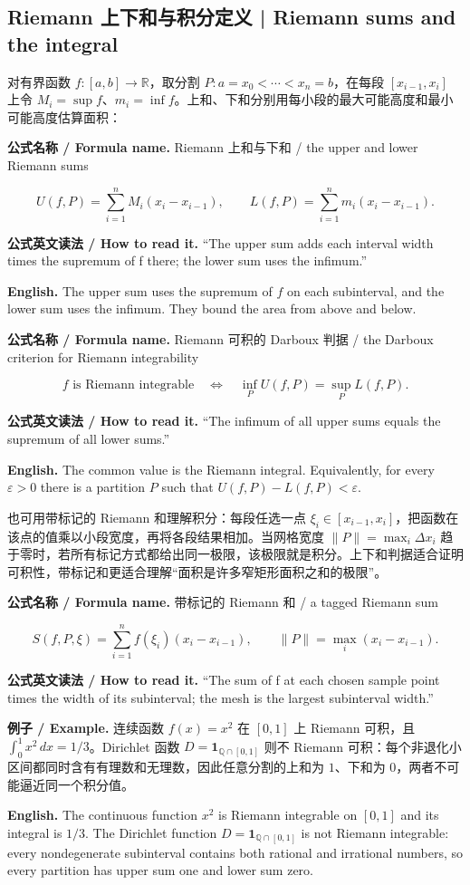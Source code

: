 \documentclass[UTF8,11pt,a4paper]{ctexart}
\newcommand{\EN}[1]{\par\noindent\textbf{English.} #1\par}
\newcommand{\READ}[1]{\par\noindent\textbf{公式英文读法 / How to read it.} #1\par}
\let\APSsubsection\subsection
\renewcommand{\subsection}[1]{\Needspace{6\baselineskip}\APSsubsection{#1}}
\newcommand{\FORMULA}[2]{\par\Needspace{3\baselineskip}\noindent\textbf{公式名称 / Formula name.} #1 / #2\par}
\newcommand{\EX}[2]{\par\noindent\textbf{例子 / Example.} #1\par\EN{#2}}
\begin{document}
\subsection{Riemann 上下和与积分定义 | Riemann sums and the integral}
\noindent 对有界函数 $f:[a,b]\to\mathbb R$，取分割 $P:a=x_0<\cdots<x_n=b$，在每段 $[x_{i-1},x_i]$ 上令 $M_i=\sup f$、$m_i=\inf f$。上和、下和分别用每小段的最大可能高度和最小可能高度估算面积：
\FORMULA{Riemann 上和与下和}{the upper and lower Riemann sums}
\[
U(f,P)=\sum_{i=1}^n M_i(x_i-x_{i-1}),
\qquad
L(f,P)=\sum_{i=1}^n m_i(x_i-x_{i-1}).
\]
\READ{“The upper sum adds each interval width times the supremum of f there; the lower sum uses the infimum.”}
\EN{The upper sum uses the supremum of $f$ on each subinterval, and the lower sum uses the infimum. They bound the area from above and below.}
\FORMULA{Riemann 可积的 Darboux 判据}{the Darboux criterion for Riemann integrability}
\[
f\text{ is Riemann integrable}
\quad\Longleftrightarrow\quad
\inf_P U(f,P)=\sup_P L(f,P).
\]
\READ{“The infimum of all upper sums equals the supremum of all lower sums.”}
\EN{The common value is the Riemann integral. Equivalently, for every $\varepsilon>0$ there is a partition $P$ such that $U(f,P)-L(f,P)<\varepsilon$.}
\noindent 也可用带标记的 Riemann 和理解积分：每段任选一点 $\xi_i\in[x_{i-1},x_i]$，把函数在该点的值乘以小段宽度，再将各段结果相加。当网格宽度 $\|P\|=\max_i\Delta x_i$ 趋于零时，若所有标记方式都给出同一极限，该极限就是积分。上下和判据适合证明可积性，带标记和更适合理解“面积是许多窄矩形面积之和的极限”。
\FORMULA{带标记的 Riemann 和}{a tagged Riemann sum}
\[
S(f,P,\xi)=\sum_{i=1}^n f(\xi_i)(x_i-x_{i-1}),\qquad
\|P\|=\max_i(x_i-x_{i-1}).
\]
\READ{“The sum of f at each chosen sample point times the width of its subinterval; the mesh is the largest subinterval width.”}
\EX{连续函数 $f(x)=x^2$ 在 $[0,1]$ 上 Riemann 可积，且 $\int_0^1x^2\,dx=1/3$。Dirichlet 函数 $D=\mathbf1_{\mathbb Q\cap[0,1]}$ 则不 Riemann 可积：每个非退化小区间都同时含有有理数和无理数，因此任意分割的上和为 $1$、下和为 $0$，两者不可能逼近同一个积分值。}{The continuous function $x^2$ is Riemann integrable on $[0,1]$ and its integral is $1/3$. The Dirichlet function $D=\mathbf1_{\mathbb Q\cap[0,1]}$ is not Riemann integrable: every nondegenerate subinterval contains both rational and irrational numbers, so every partition has upper sum one and lower sum zero.}
\end{document}

